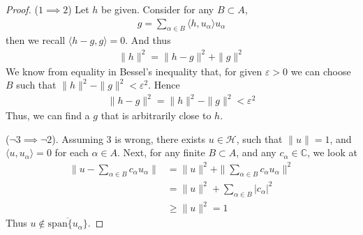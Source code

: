 \begin{proof}
  ($1 \implies 2$) Let $h$ be given. Consider for any $B \subset A$,
  \begin{align*}
    g = \sum_{\alpha \in  B} \langle h , u_\alpha \rangle  u_\alpha
  \end{align*}
  then we recall $\langle h- g , g \rangle  = 0$. And thus
  \begin{align*}
    \|h\|^2 =  \|h- g\|^2 + \|g\|^2
  \end{align*}
  We know from equality in Bessel's inequality that, for given
  $\varepsilon > 0$  we can choose $B$ such that $\|h\|^2 - \|g\|^2 <
  \varepsilon^2$. Hence
  \begin{align*}
    \|h - g\|^2 = \|h\|^2 - \|g\|^2 < \varepsilon^2
  \end{align*}
  Thus, we can find a $g$ that is arbitrarily close to $h$.

  ($\neg 3 \implies \neg 2$). Assuming $3$ is wrong, there exists $u
  \in \mathcal{H}$, such that $\|u\| = 1$, and $\langle u , u_\alpha
  \rangle = 0$ for each $\alpha \in A$. Next, for any finite $B
  \subset A$, and any $c_\alpha \in \mathbb{C}$, we look at
  \begin{align*}
    \|u - \sum_{\alpha \in  B} c_\alpha u_\alpha\| &= \|u\|^2 +
    \|\sum_{\alpha \in  B} c_\alpha u_\alpha\|^2 \\
    &= \|u\|^2 + \sum_{\alpha \in  B} |c_\alpha|^2 \\
    & \ge \|u\|^2 = 1
  \end{align*}
  Thus $u \not\in \overline{\textrm{span} \{ u_\alpha \}}$.


\end{proof}
